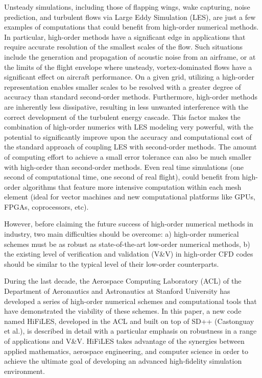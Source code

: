 Unsteady simulations, including those of flapping wings, wake capturing, noise prediction, and turbulent flows via Large Eddy Simulation (LES), are just a few examples of computations that could benefit from high-order numerical methods. In particular, high-order methods have a significant edge in applications that require accurate resolution of the smallest scales of the flow. Such situations include the generation and propagation of acoustic noise from an airframe, or at the limits of the flight envelope where unsteady, vortex-dominated flows have a significant effect on aircraft performance. On a given grid, utilizing a high-order representation enables smaller scales to be resolved with a greater degree of accuracy than standard second-order methods. Furthermore, high-order methods are inherently less dissipative, resulting in less unwanted interference with the correct development of the turbulent energy cascade. This factor makes the combination of high-order numerics with LES modeling very powerful, with the potential to significantly improve upon the accuracy and computational cost of the standard approach of coupling LES with second-order methods. The amount of computing effort to achieve a small error tolerance can also be much smaller with high-order than second-order methods. Even real time simulations (one second of computational time, one second of real flight), could benefit from high-order algorithms that feature more intensive computation within each mesh element (ideal for vector machines and new computational platforms like GPUs, FPGAs, coprocessors, etc).

However, before claiming the future success of high-order numerical methods in industry, two main difficulties should be overcome: a) high-order numerical schemes must be as robust as state-of-the-art low-order numerical methods, b) the existing level of verification and validation (V\&V) in high-order CFD codes should be similar to the typical level of their low-order counterparts.

During the last decade, the Aerospace Computing Laboratory (ACL) of the Department of Aeronautics and Astronautics at Stanford University has developed a series of high-order numerical schemes and computational tools that have demonstrated the viability of these schemes. In this paper, a new code named HiFiLES, developed in the ACL and built on top of SD++ (Castonguay et al.\cite{castonguay2011}), is described in detail with a particular emphasis on robustness in a range of applications and V\&V. HiFiLES takes advantage of the synergies between applied mathematics, aerospace engineering, and computer science in order to achieve the ultimate goal of developing an advanced high-fidelity simulation environment.

